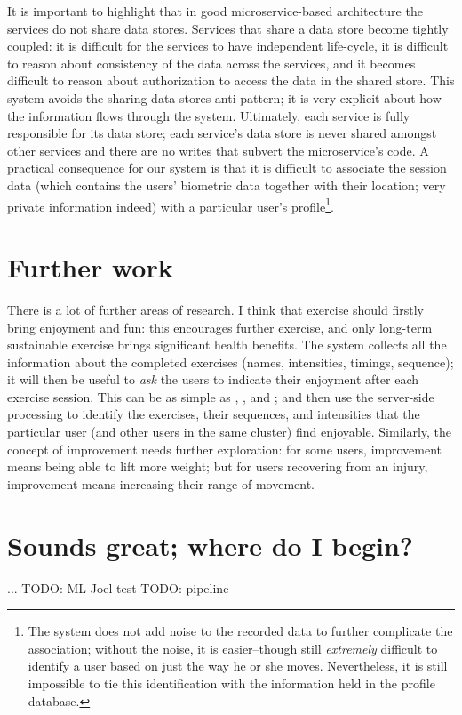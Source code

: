 It is important to highlight that in good microservice-based architecture the services do not share data stores. Services that share a data store become tightly coupled: it is difficult for the services to have independent life-cycle, it is difficult to reason about consistency of the data across the services, and it becomes difficult to reason about authorization to access the data in the shared store.
This system avoids the sharing data stores anti-pattern; it is very explicit about how the information flows through the system. Ultimately, each service is fully responsible for its data store; each service's data store is never shared amongst other services and there are no writes that subvert the microservice's code.
A practical consequence for our system is that it is difficult to associate the session data (which contains the users' biometric data together with their location; very private information indeed) with a particular user's profile\footnote{The system does not add noise to the recorded data to further complicate the association; without the noise, it is easier--though still \emph{extremely} difficult to identify a user based on just the way he or she moves. Nevertheless, it is still impossible to tie this identification with the information held in the profile database.}. 

\section{Further work}
There is a lot of further areas of research. I think that exercise should firstly bring enjoyment and fun: this encourages further exercise, and only long-term sustainable exercise brings significant health benefits. The system collects all the information about the completed exercises (names, intensities, timings, sequence); it will then be useful to \emph{ask} the users to indicate their enjoyment after each exercise session. This can be as simple as \smiley{}, \neutranie{}, and \frownie{}; and then use the server-side processing to identify the exercises, their sequences, and intensities that the particular user (and other users in the same cluster) find enjoyable. Similarly, the concept of improvement needs further exploration: for some users, improvement means being able to lift more weight; but for users recovering from an injury, improvement means increasing their range of movement.

\section{Sounds great; where do I begin?}
...
TODO: ML Joel test
TODO: pipeline

\printbibliography

 